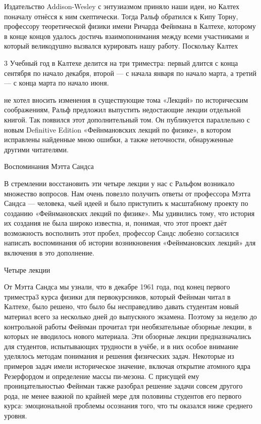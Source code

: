 \documentclass[10pt,oneside]{article}
\newcommand{\TipsRunning}[1]{\par\vspace{2bp}{\centering\footnotesize #1\par}\vspace{2bp}}
\begin{document}
Издательство Addison-Wesley с энтузиазмом приняло наши идеи, но Калтех поначалу отнёсся к ним скептически. Тогда Ральф обратился к Кипу Торну, профессору теоретической физики имени Ричарда Фейнмана в Калтехе, которому в конце концов удалось достичь взаимопонимания между всеми участниками и который великодушно вызвался курировать нашу работу. Поскольку Калтех\par

\TipsRunning{В В Е Д Е Н И Е • x i i i}

3 Учебный год в Калтехе делится на три триместра: первый длится с конца сентября по начало декабря, второй --- с начала января по начало марта, а третий --- с конца марта по начало июня.\par

не хотел вносить изменения в существующие тома «Лекций» по историческим соображениям, Ральф предложил выпустить недостающие лекции отдельной книгой. Так появился этот дополнительный том. Он публикуется параллельно с новым Definitive Edition «Фейнмановских лекций по физике», в котором исправлены найденные мною ошибки, а также неточности, обнаруженные другими читателями.\par

Воспоминания Мэтта Сандса\par

В стремлении восстановить эти четыре лекции у нас с Ральфом возникало множество вопросов. Нам очень повезло получить ответы от профессора Мэтта Сандса --- человека, чьей идеей и было приступить к масштабному проекту по созданию «Фейнмановских лекций по физике». Мы удивились тому, что история их создания не была широко известна, и, понимая, что этот проект даёт возможность восполнить этот пробел, профессор Сандс любезно согласился написать воспоминания об истории возникновения «Фейнмановских лекций» для включения в это дополнение.\par

Четыре лекции\par

От Мэтта Сандса мы узнали, что в декабре 1961 года, под конец первого триместра3 курса физики для первокурсников, который Фейнман читал в Калтехе, было решено, что было бы несправедливо давать студентам новый материал всего за несколько дней до выпускного экзамена. Поэтому за неделю до контрольной работы Фейнман прочитал три необязательные обзорные лекции, в которых не вводилось нового материала. Эти обзорные лекции предназначались для студентов, испытывающих трудности в учёбе, и в них особое внимание уделялось методам понимания и решения физических задач. Некоторые из примеров задач имели историческое значение, включая открытие атомного ядра Резерфордом и определение массы пи-мезона. С присущей ему проницательностью Фейнман также разобрал решение задачи совсем другого рода, не менее важной по крайней мере для половины студентов его первого курса: эмоциональной проблемы осознания того, что ты оказался ниже среднего уровня.\par
\end{document}
